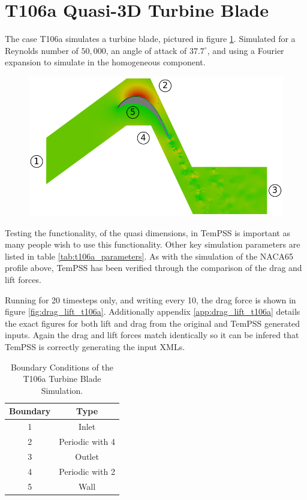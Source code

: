 \documentclass[11pt, a4paper]{report}
\begin{document}
\newpage
\section{T106a Quasi-3D Turbine Blade}
The case T106a simulates a turbine blade, pictured in figure \ref{fig:t106a_domain}. Simulated for a Reynolds number of $50,000$, an angle of attack of $37.7^{\circ}$, and using a Fourier expansion to simulate in the homogeneous component.

\begin{figure}[htb!]
 \centering
 \includegraphics[width=.95\linewidth,  clip=true, trim = 0cm 0cm 0cm 0cm]{t106a_domain}
 \label{fig:t106a_domain}
\end{figure}

Testing the functionality, of the quasi dimensions, in TemPSS is important as many people wish to use this functionality. Other key simulation parameters are listed in table \ref{tab:t106a_parameters}. As with the simulation of the NACA65 profile above, TemPSS has been verified through the comparison of the drag and lift forces.

Running for 20 timesteps only, and writing every 10, the drag force is shown in figure \ref{fig:drag_lift_t106a}. Additionally appendix \ref{app:drag_lift_t106a}  details the exact figures for both lift and drag from the original and TemPSS generated inputs. Again the drag and lift forces match identically so it can be infered that TemPSS is correctly generating the input XMLs.
\begin{table}[htb!]
	\centering
    \begin{tabular}{ c || c }
    \hline
    Boundary & Type \\
    \hline
    1 & Inlet \\
    2 & Periodic with 4\\
    3 & Outlet\\
    4 & Periodic with 2\\
    5 & Wall\\
    \hline
    \end{tabular}
    \caption{Boundary Conditions of the T106a Turbine Blade Simulation.}
    \label{tab:t106a_boundaries}
\end{table}
\end{document}
